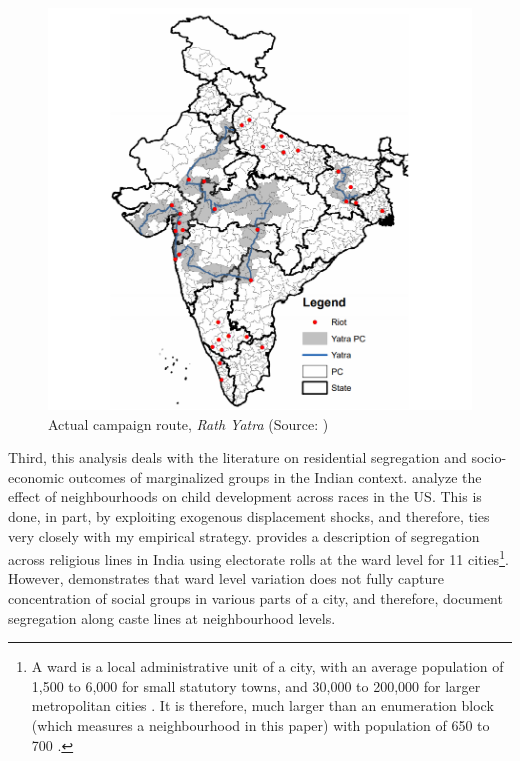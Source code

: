 \documentclass{article}
\begin{document}
\begin{figure}[h!]
    \centering
    \includegraphics[scale=0.55]{images/blakeslee.png}
    \caption{Actual campaign route, \emph{Rath Yatra} (Source: \cite{blakeslee.2018})}
    \label{fig:route_b}
\end{figure}

Third, this analysis deals with the literature on residential segregation and socio-economic outcomes of marginalized groups in the Indian context. \cite{chetty2018impacts} analyze the effect of neighbourhoods on child development across races in the US. This is done, in part, by exploiting exogenous displacement shocks, and therefore, ties very closely with my empirical strategy. \cite{susewind2017muslims} provides a description of segregation across religious lines in India using electorate rolls at the ward level for 11 cities\footnote{A ward is a local administrative unit of a city, with an average population of 1,500 to 6,000 for small statutory towns, and 30,000 to 200,000 for larger metropolitan cities \citep{prasad2006wards}. It is therefore, much larger than an enumeration block (which measures a neighbourhood in this paper) with population of 650 to 700 \citep{secc.2011}.}. However, \cite{bharathi2018isolated} demonstrates that ward level variation does not fully capture concentration of social groups in various parts of a city, and therefore, document segregation along caste lines at neighbourhood levels.
\end{document}
